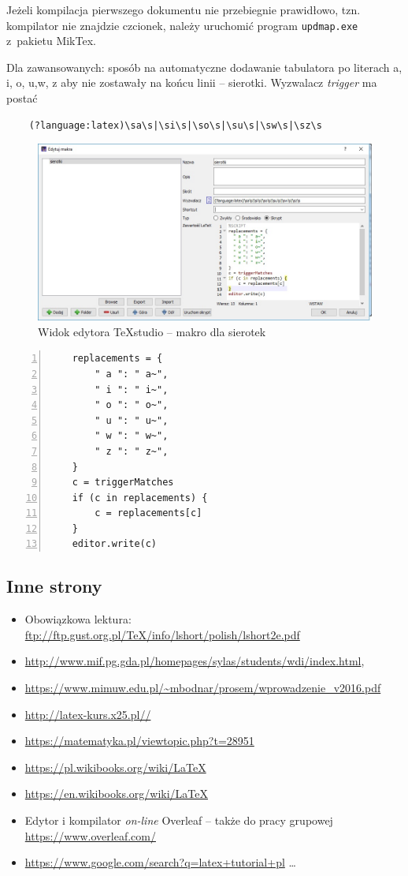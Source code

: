 \documentclass[
    left=2.5cm,         %
    right=2.5cm,        %
    top=2.5cm,          %
    bottom=3cm,         %
    bindingoffset=6mm,  %
    nohyphenation=true %
]{eiti/eiti-thesis} %
\begin{document}
Jeżeli kompilacja pierwszego dokumentu nie przebiegnie prawidłowo, tzn. kompilator nie znajdzie czcionek, należy uruchomić program \texttt{updmap.exe} z~pakietu MikTex.

Dla zawansowanych: sposób na automatyczne dodawanie tabulatora po literach a, i, o, u,w, z aby nie zostawały na końcu linii -- sierotki. Wyzwalacz \textit{trigger} ma postać \begin{verbatim}
	(?language:latex)\sa\s|\si\s|\so\s|\su\s|\sw\s|\sz\s
\end{verbatim}

\begin{figure}[h]
	\centering
	\includegraphics[width=1\textwidth]{sierotki.jpg}
	\caption{\label{fig:sierotki}Widok edytora TeXstudio -- makro dla sierotek}
\end{figure}

\begin{lstlisting}[label=lst:sierotki,caption={Widok edytora TeXstudio -- dodanie makra do sierotek},numbers=left]
	%SCRIPT
	replacements = {
		" a ": " a~",
		" i ": " i~",
		" o ": " o~",
		" u ": " u~",
		" w ": " w~",
		" z ": " z~",
	}
	c = triggerMatches
	if (c in replacements) {
		c = replacements[c]
	}
	editor.write(c)
\end{lstlisting}


\subsection{Inne strony}
\begin{itemize}
	\item Obowiązkowa lektura: \url{ftp://ftp.gust.org.pl/TeX/info/lshort/polish/lshort2e.pdf}	
	\item \url{http://www.mif.pg.gda.pl/homepages/sylas/students/wdi/index.html},
	\item \url{https://www.mimuw.edu.pl/~mbodnar/prosem/wprowadzenie_v2016.pdf}	
	\item \url{http://latex-kurs.x25.pl//}
	\item \url{https://matematyka.pl/viewtopic.php?t=28951}	
	\item \url{https://pl.wikibooks.org/wiki/LaTeX}	
	\item \url{https://en.wikibooks.org/wiki/LaTeX}
	\item Edytor i kompilator \textit{on-line} Overleaf -- także do pracy grupowej \url{https://www.overleaf.com/}
	\item \url{https://www.google.com/search?q=latex+tutorial+pl} \dots	
\end{itemize}
\end{document}
